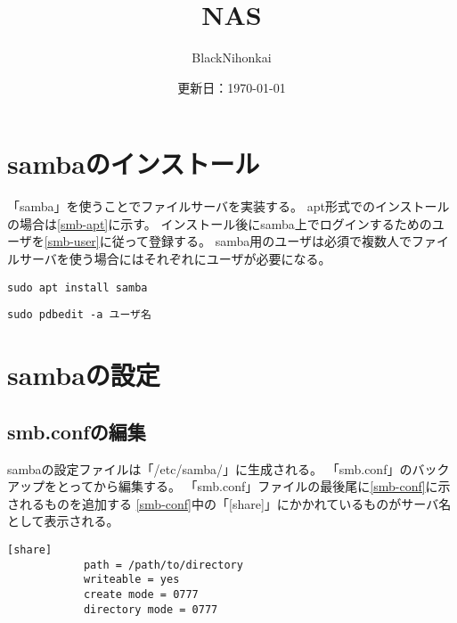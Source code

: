\documentclass[a4paper,10pt]{jsarticle}
\title{NAS}
\author{BlackNihonkai}
\date{更新日：\today}
\begin{document}
\maketitle



\section{sambaのインストール}
    「samba」を使うことでファイルサーバを実装する。
    apt形式でのインストールの場合は\ref{smb-apt}に示す。
    インストール後にsamba上でログインするためのユーザを\ref{smb-user}に従って登録する。
    samba用のユーザは必須で複数人でファイルサーバを使う場合にはそれぞれにユーザが必要になる。

    \begin{lstlisting}[caption=sambaのインストール,label=smb-apt]
        sudo apt install samba
    \end{lstlisting}

    \begin{lstlisting}[caption=sambaのユーザ登録,label=smb-user]
        sudo pdbedit -a ユーザ名
    \end{lstlisting}

\section{sambaの設定}
    \subsection{smb.confの編集}
        sambaの設定ファイルは「/etc/samba/」に生成される。
        「smb.conf」のバックアップをとってから編集する。
        「smb.conf」ファイルの最後尾に\ref{smb-conf}に示されるものを追加する
        \ref{smb-conf}中の「[share]」にかかれているものがサーバ名として表示される。

        \begin{lstlisting}[caption=smb.confの追加内容,label=smb-conf]
            [share]
            path = /path/to/directory
            writeable = yes
            create mode = 0777
            directory mode = 0777
        \end{lstlisting}
        
\end{document}
